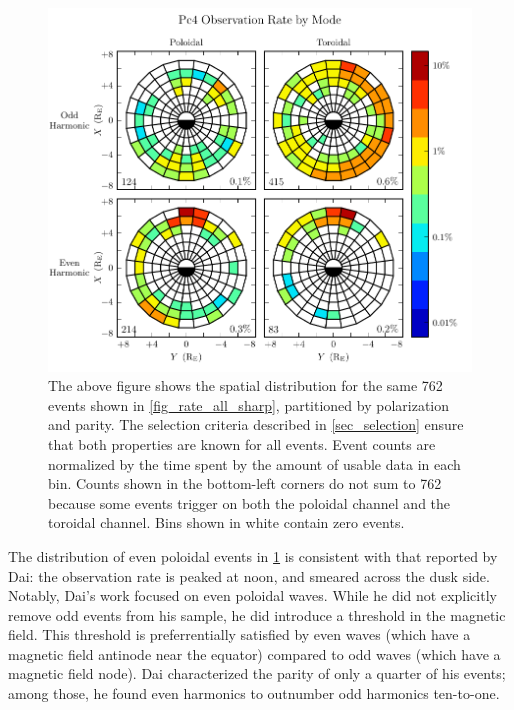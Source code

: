 \begin{figure}[!htb]
    \centering
    \includegraphics[width=\textwidth]{figures/mode_all_sharp.pdf}
    \caption[Observation Rate of Pc4 Events by Mode]{
      The above figure shows the spatial distribution for the same 762 events shown in \cref{fig_rate_all_sharp}, partitioned by polarization and parity. The selection criteria described in \cref{sec_selection} ensure that both properties are known for all events. Event counts are normalized by the time spent by the amount of usable data in each bin. Counts shown in the bottom-left corners do not sum to 762 because some events trigger on both the poloidal channel and the toroidal channel. Bins shown in white contain zero events. 
    }
    \label{fig_mode_all_sharp}
\end{figure}

The distribution of even poloidal events in \cref{fig_mode_all_sharp} is consistent with that reported by Dai\cite{dai_2015}: the observation rate is peaked at noon, and smeared across the dusk side. Notably, Dai's work focused on even poloidal waves. While he did not explicitly remove odd events from his sample, he did introduce a threshold in the magnetic field. This threshold is preferrentially satisfied by even waves (which have a magnetic field antinode near the equator) compared to odd waves (which have a magnetic field node). Dai characterized the parity of only a quarter of his events; among those, he found even harmonics to outnumber odd harmonics ten-to-one. 

